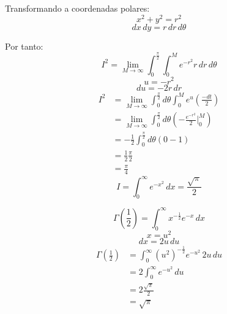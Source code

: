 Transformando a coordenadas polares:
\begin{equation*}
    x^2+y^2=r^2
\end{equation*}
\begin{equation*}
    dx\,dy=r\,dr\,d\theta
\end{equation*}

Por tanto:
\begin{equation*}
    I^2=\lim_{M\rightarrow\infty}\int_0^{\frac{\pi}{2}}
        \int_0^{M}e^{-r^2}r\,dr\,d\theta
\end{equation*}
\begin{equation*}
    u=-r^2
\end{equation*}
\begin{equation*}
    du=-2r\,dr
\end{equation*}
\begin{equation*}
\begin{split}
    I^2
        &=\lim_{M\rightarrow\infty}\int_0^{\frac{\pi}{2}}d\theta
        \int_0^{M}e^u\left(\frac{-dt}{2}\right)\\
        &=\lim_{M\rightarrow\infty}\int_0^{\frac{\pi}{2}}d\theta
        \left(-\frac{e^{-r^2}}{2}\Biggr|_0^M\right)\\
        &=-\frac{1}{2}\int_0^{\frac{\pi}{2}}d\theta(0-1)\\
        &=\frac{1}{2}\frac{\pi}{2}\\
        &=\frac{\pi}{4}
\end{split}
\end{equation*}
\begin{equation*}
    I=\int_0^{\infty}e^{-x^2}\,dx=\frac{\sqrt{\pi}}{2}
\end{equation*}

\begin{equation*}
    \Gamma\left(\frac{1}{2}\right)=\int_0^{\infty}x^{-\frac{1}{2}}e^{-x}\,dx
\end{equation*}
\begin{equation*}
    x=u^2
\end{equation*}
\begin{equation*}
    dx=2u\,du
\end{equation*}
\begin{equation*}
\begin{split}
    \Gamma\left(\frac{1}{2}\right)
        &=\int_0^{\infty}{({u^2})}^{-\frac{1}{2}}e^{-u^2}\,2u\,du\\
        &=2\int_0^{\infty}e^{-u^2}\,du\\
        &=2\frac{\sqrt{\pi}}{2}\\
        &=\sqrt{\pi}
\end{split}
\end{equation*}

